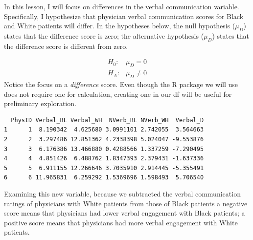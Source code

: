\documentclass[
  11pt,
]{book}
\newenvironment{Shaded}{\begin{snugshade}}{\end{snugshade}}
\newcommand{\CommentTok}[1]{\textcolor[rgb]{0.37,0.37,0.37}{\textit{#1}}}
\newcommand{\FunctionTok}[1]{\textcolor[rgb]{0.27,0.27,0.27}{\textbf{#1}}}
\newcommand{\NormalTok}[1]{#1}
\newcommand{\OtherTok}[1]{\textcolor[rgb]{0.37,0.37,0.37}{#1}}
\newcommand{\SpecialCharTok}[1]{\textcolor[rgb]{0.43,0.43,0.43}{\textbf{#1}}}
\begin{document}
In this lesson, I will focus on differences in the verbal communication variable. Specifically, I hypothesize that physician verbal communication scores for Black and White patients will differ. In the hypotheses below, the null hypothesis (\(\mu_D\)) states that the difference score is zero; the alternative hypothesis (\(\mu_D\)) states that the difference score is different from zero.

\[
\begin{array}{ll}
H_0: & \mu_D = 0  \\
H_A: & \mu_D \neq 0
\end{array}
\] Notice the focus on a \emph{difference} score. Even though the R package we will use does not require one for calculation, creating one in our df will be useful for preliminary exploration.

\begin{Shaded}
\end{Shaded}

\begin{verbatim}
  PhysID Verbal_BL Verbal_WH  NVerb_BL NVerb_WH  Verbal_D
1      1  8.190342  4.625680 3.0991101 2.742055  3.564663
2      2  3.297486 12.851362 4.2338398 5.024047 -9.553876
3      3  6.176386 13.466880 0.4288566 1.337259 -7.290495
4      4  4.851426  6.488762 1.8347393 2.379431 -1.637336
5      5  6.911155 12.266646 3.7035910 2.914445 -5.355491
6      6 11.965831  6.259292 1.5369696 1.598493  5.706540
\end{verbatim}

Examining this new variable, because we subtracted the verbal communication ratings of physicians with White patients from those of Black patients a negative score means that physicians had lower verbal engagement with Black patients; a positive score means that physicians had more verbal engagement with White patients.
\end{document}
